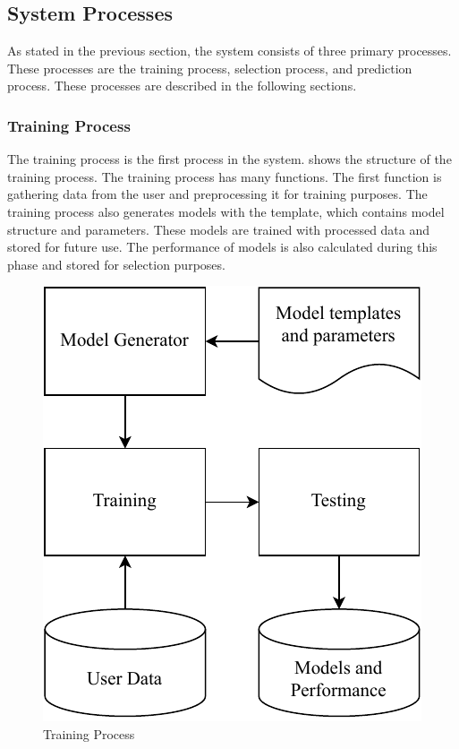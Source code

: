\documentclass[a4paper,fleqn]{cas-dc}
\begin{document}
\subsection{System Processes}\label{subsec:system_processes}

As stated in the previous section, the system consists of three primary processes. These processes are the training process, selection process, and prediction process. These processes are described in the following sections.

\subsubsection{Training Process}\label{subsubsec:training_process}

The training process is the first process in the system.  shows the structure of the training process. The training process has many functions. The first function is gathering data from the user and preprocessing it for training purposes. The training process also generates models with the template, which contains model structure and parameters. These models are trained with processed data and stored for future use. The performance of models is also calculated during this phase and stored for selection purposes.

\begin{figure}[ht]
    \centering
    \includegraphics[width=0.7\columnwidth]{training_and_testing.pdf}
    \caption{Training Process}
    \label{fig:training_process}
\end{figure}
\end{document}
